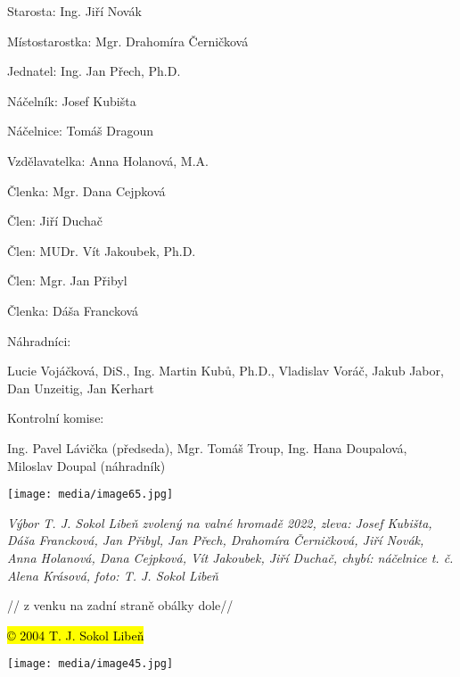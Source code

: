 Starosta: Ing. Jiří Novák

Místostarostka: Mgr. Drahomíra Černičková

Jednatel: Ing. Jan Přech, Ph.D.

Náčelník: Josef Kubišta

Náčelnice: Tomáš Dragoun

Vzdělavatelka: Anna Holanová, M.A.

Členka: Mgr. Dana Cejpková

Člen: Jiří Duchač

Člen: MUDr. Vít Jakoubek, Ph.D.

Člen: Mgr. Jan Přibyl

Členka: Dáša Francková

Náhradníci:

Lucie Vojáčková, DiS., Ing. Martin Kubů, Ph.D., Vladislav Voráč, Jakub
Jabor, Dan Unzeitig, Jan Kerhart

Kontrolní komise:

Ing. Pavel Lávička (předseda), Mgr. Tomáš Troup, Ing. Hana Doupalová,
Miloslav Doupal (náhradník)

\texttt{[image: media/image65.jpg]}

\emph{Výbor T. J. Sokol Libeň zvolený na valné hromadě 2022, zleva:
Josef Kubišta, Dáša Francková, Jan Přibyl, Jan Přech, Drahomíra
Černičková, Jiří Novák, Anna Holanová, Dana Cejpková, Vít Jakoubek, Jiří
Duchač, chybí: náčelnice t. č. Alena Krásová, foto: T. J. Sokol Libeň}

// z venku na zadní straně obálky dole//

\hl{© 2004 T. J. Sokol Libeň}

\texttt{[image: media/image45.jpg]}
